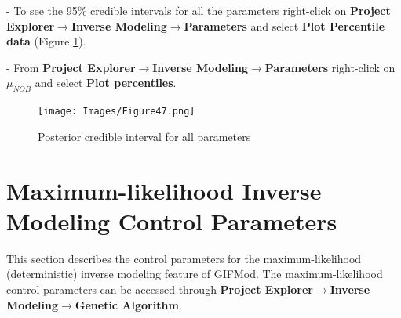 \begin{itemize}
- To see the 95\% credible intervals for all the parameters right-click on \textbf{Project Explorer}$\rightarrow$\textbf{Inverse Modeling}$\rightarrow$\textbf{Parameters} and select \textbf{Plot Percentile data} (Figure \ref{fig:47}). 


-  From \textbf{Project Explorer}$\rightarrow$\textbf{Inverse Modeling}$\rightarrow$\textbf{Parameters} right-click on $\mu_{NOB}$ and select \textbf{Plot percentiles}. 

\begin{figure}[!ht]
\begin{center}
\texttt{[image: Images/Figure47.png]} \\
\caption{Posterior credible interval for all parameters}\label{fig:47}
\end{center}
\end{figure} 

\end{itemize}
\section{Maximum-likelihood Inverse Modeling Control Parameters}

This section describes the control parameters for the maximum-likelihood (deterministic) inverse modeling feature of GIFMod. The maximum-likelihood control parameters can be accessed through \textbf{Project Explorer}$\rightarrow$\textbf{Inverse Modeling}$\rightarrow$\textbf{Genetic Algorithm}.

